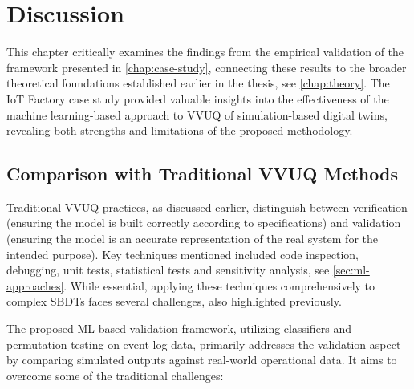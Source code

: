 \chapter{Discussion}
\label{chap:discussion}

This chapter critically examines the findings from the empirical validation of the framework presented in \autoref{chap:case-study}, connecting these results to the broader theoretical foundations established earlier in the thesis, see \autoref{chap:theory}. The IoT Factory case study provided valuable insights into the effectiveness of the machine learning-based approach to VVUQ of simulation-based digital twins, revealing both strengths and limitations of the proposed methodology.

\section{Comparison with Traditional VVUQ Methods}
\label{sec:comparison_manual}

Traditional VVUQ practices, as discussed earlier, distinguish between verification (ensuring the model is built correctly according to specifications) and validation (ensuring the model is an accurate representation of the real system for the intended purpose). Key techniques mentioned included code inspection, debugging, unit tests, statistical tests and sensitivity analysis, see \autoref{sec:ml-approaches}. While essential, applying these techniques comprehensively to complex SBDTs faces several challenges, also highlighted previously.

The proposed ML-based validation framework, utilizing classifiers and permutation testing on event log data, primarily addresses the validation aspect by comparing simulated outputs against real-world operational data. It aims to overcome some of the traditional challenges:

